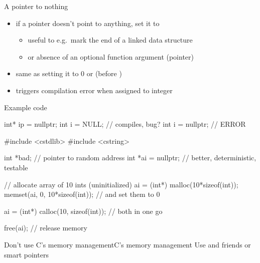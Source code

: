 \begin{frame}[fragile]
  \begin{block}{A pointer to nothing}
    \begin{itemize}
    \item if a pointer doesn't point to anything, set it to 
    \begin{itemize}
      \item useful to e.g.\ mark the end of a linked data structure
      \item or absence of an optional function argument (pointer)
    \end{itemize}
    \item same as setting it to 0 or  (before )
    \item triggers compilation error when assigned to integer
    \end{itemize}
  \end{block}
  \pause
  \begin{exampleblock}{Example code}
    \begin{cppcode*}{}
      int* ip = nullptr;
      int i = NULL;      // compiles, bug?
      int i = nullptr;   // ERROR
    \end{cppcode*}
  \end{exampleblock}
\end{frame}

\begin{frame}[fragile]
  \begin{cppcode}
    #include <cstdlib>
    #include <cstring>

    int *bad;          // pointer to random address
    int *ai = nullptr; // better, deterministic, testable

    // allocate array of 10 ints (uninitialized)
    ai = (int*) malloc(10*sizeof(int));
    memset(ai, 0, 10*sizeof(int)); // and set them to 0

    ai = (int*) calloc(10, sizeof(int)); // both in one go

    free(ai); // release memory
  \end{cppcode}
  \begin{goodpracticeWithShortcut}{Don't use C's memory management}{C's memory management}
    Use  and friends or smart pointers
  \end{goodpracticeWithShortcut}
\end{frame}
